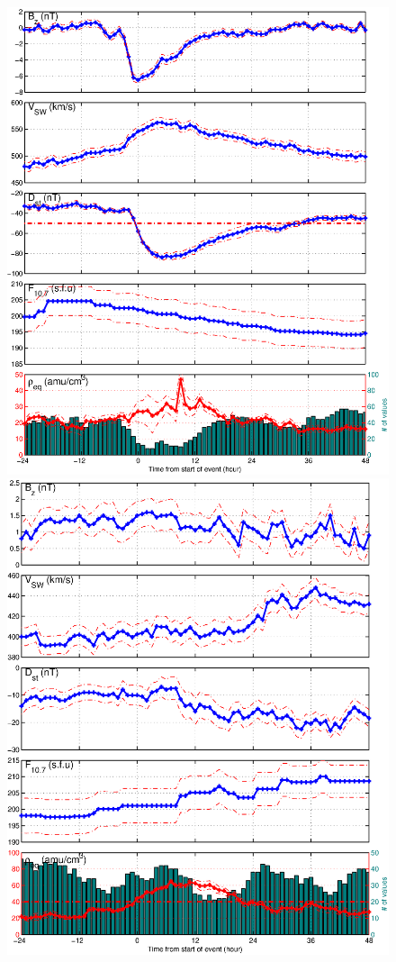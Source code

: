 \documentclass[10pt,twocolumn]{article}
\begin{document}
\begin{figure}[htp!]
\centering
\includegraphics[scale=0.45]{paperfigures/stormavs-dd12.eps}
\includegraphics[scale=0.45]{paperfigures/stormavs-md12.eps}

\end{figure}
\end{document}
